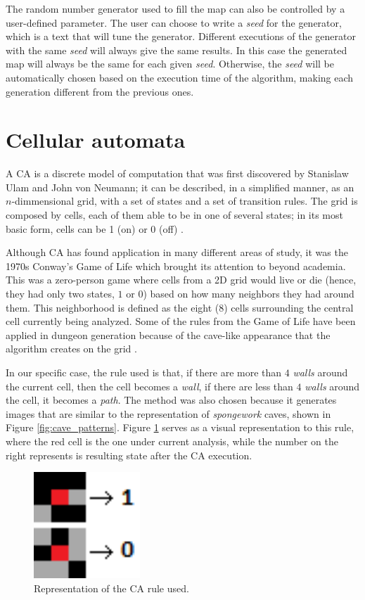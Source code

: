 The random number generator used to fill the map can also be controlled by a user-defined parameter. The user can choose to write a \emph{seed} for the generator, which is a text that will tune the generator. Different executions of the generator with the same \emph{seed} will always give the same results. In this case the generated map will always be the same for each given \emph{seed}. Otherwise, the \emph{seed} will be automatically chosen based on the execution time of the algorithm, making each generation different from the previous ones.

\section{Cellular automata}

A CA is a discrete model of computation that was first discovered by Stanislaw Ulam and John von Neumann; it can be described, in a simplified manner, as an \(n\)-dimmensional grid, with a set of states and a set of transition rules. The grid is composed by cells, each of them able to be in one of several states; in its most basic form, cells can be 1 (on) or 0 (off) \cite{wolfram:1983}.

Although CA has found application in many different areas of study, it was the 1970s Conway's Game of Life which brought its attention to beyond academia. This was a zero-person game where cells from a 2D grid would live or die (hence, they had only two states, \(1\) or \(0\)) based on how many neighbors they had around them. This neighborhood is defined as the eight (8) cells surrounding the central cell currently being analyzed. Some of the rules from the Game of Life have been applied in dungeon generation because of the cave-like appearance that the algorithm creates on the grid \cite{shaker:2016}.

In our specific case, the rule used is that, if there are more than \(4\) \emph{walls} around the current cell, then the cell becomes a \emph{wall}, if there are less than \(4\) \emph{walls} around the cell, it becomes a \emph{path}. The method was also chosen because it generates images that are similar to the representation of \emph{spongework} caves, shown in Figure \ref{fig:cave_patterns}. Figure \ref{fig:ca_rule} serves as a visual representation to this rule, where the red cell is the one under current analysis, while the number on the right represents is resulting state after the CA execution.

\begin{figure}[h]
    \caption{Representation of the CA rule used.}
    \centerline{\includegraphics[width=4cm]{images/development/ca_rule.png}}
    \label{fig:ca_rule}
\end{figure}

